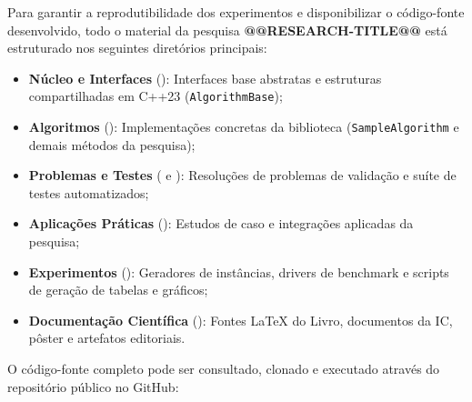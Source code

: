 \documentclass[12pt,a4paper]{article}
\begin{document}
\newpage

\label{ap:github}

Para garantir a reprodutibilidade dos experimentos e disponibilizar o código-fonte desenvolvido, todo o material da pesquisa \textbf{@@RESEARCH-TITLE@@} está estruturado nos seguintes diretórios principais:
\begin{itemize}[leftmargin=1.5em, itemsep=0.2em]
\raggedright
    \item \textbf{Núcleo e Interfaces} (): Interfaces base abstratas e estruturas compartilhadas em C++23 (\lstinline{AlgorithmBase});
    \item \textbf{Algoritmos} (): Implementações concretas da biblioteca (\lstinline{SampleAlgorithm} e demais métodos da pesquisa);
    \item \textbf{Problemas e Testes} ( e ): Resoluções de problemas de validação e suíte de testes automatizados;
    \item \textbf{Aplicações Práticas} (): Estudos de caso e integrações aplicadas da pesquisa;
    \item \textbf{Experimentos} (): Geradores de instâncias, drivers de benchmark e scripts de geração de tabelas e gráficos;
    \item \textbf{Documentação Científica} (): Fontes LaTeX do Livro, documentos da IC, pôster e artefatos editoriais.
\end{itemize}

O código-fonte completo pode ser consultado, clonado e executado através do repositório público no GitHub:

\vspace{0.4cm}
\begin{center}
\end{center}
\vspace{0.4cm}
\end{document}
